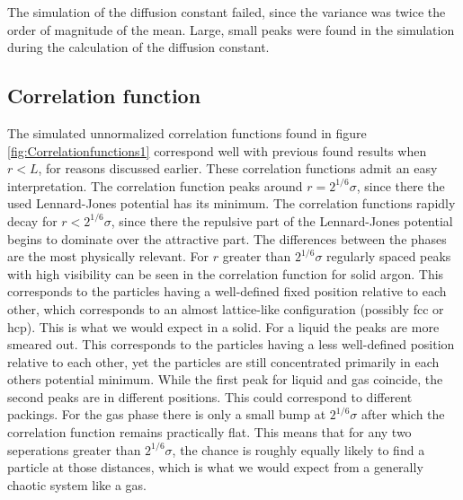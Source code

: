 The simulation of the diffusion constant failed, since the variance was twice the order of magnitude of the mean. Large, small peaks were found in the simulation during the calculation of the diffusion constant. 


\subsection{Correlation function}

The simulated unnormalized correlation functions found in figure \ref{fig:Correlationfunctions1} correspond well with previous found results \cite{PhysRev.136.A405}\cite{yoon1981radial}\cite{franchetti1975radial}\cite{jos} when $r<L$, for reasons discussed earlier. These correlation functions admit an easy interpretation. The correlation function peaks around $r = 2^{1/6} \sigma$, since there the used Lennard-Jones potential has its minimum. The correlation functions rapidly decay for $r<2^{1/6} \sigma$, since there the repulsive part of the Lennard-Jones potential begins to dominate over the attractive part. The differences between the phases are the most physically relevant. For $r$ greater than $2^{1/6}\sigma$ regularly spaced peaks with high visibility can be seen in the correlation function for solid argon. This corresponds to the particles having a well-defined fixed position relative to each other, which corresponds to an almost lattice-like configuration (possibly fcc or hcp\cite{van1991can}). This is what we would expect in a solid. For a liquid the peaks are more smeared out. This corresponds to the particles having a less well-defined position relative to each other, yet the particles are still concentrated primarily in each others potential minimum. While the first peak for liquid and gas coincide, the second peaks are in different positions. This could correspond to different packings. For the gas phase there is only a small bump at $2^{1/6}\sigma$ after which the correlation function remains practically flat. This means that for any two seperations greater than $2^{1/6}\sigma$, the chance is roughly equally likely to find a particle at those distances, which is what we would expect from a generally chaotic system like a gas.








